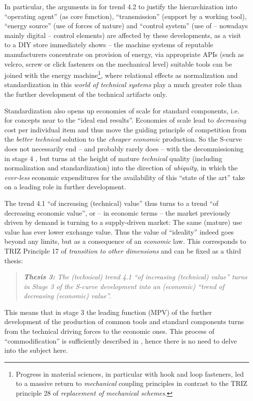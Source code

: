 \documentclass{llncs}
\begin{document}
In particular, the arguments in \cite{TESE2018} for trend 4.2 to justify the
hierarchization into ``operating agent'' (as core function), ``transmission''
(support by a working tool), ``energy source'' (use of forces of nature) and
``control system'' (use of -- nowadays mainly digital -- control elements) are
affected by these developments, as a visit to a DIY store immediately shows --
the machine systems of reputable manufacturers concentrate on provision of
energy, via appropriate APIs (such as velcro, screw or click fasteners on the
mechanical level) suitable tools can be joined with the energy
machine\footnote{Progress in material sciences, in particular with hook and
  loop fasteners, led to a massive return to \emph{mechanical} coupling
  principles in contrast to the TRIZ principle 28 of \emph{replacement of
    mechanical schemes}.}, where relational effects as normalization and
standardization in this \emph{world of technical systems} play a much greater
role than the further development of the technical artifacts only.

Standardization also opens up economies of scale for standard components,
i.e. for concepts near to the ``ideal end results''.  Economies of scale lead
to \emph{decreasing} cost per individual item and thus move the guiding
principle of competition from the \emph{better technical} solution to the
\emph{cheaper economic} production. So the S-curve does not necessarily end --
and probably rarely does -- with the decommissioning in stage 4
\cite[p. 38]{TESE2018}, but turns at the height of mature \emph{technical}
quality (including normalization and standardization) into the direction of
\emph{ubiquity}, in which the \emph{ever-less} economic expenditures for the
availability of this ``state of the art'' take on a leading role in further
development.

The trend 4.1 ``of increasing (technical) value'' thus turns to a trend ``of
decreasing economic value'', or -- in economic terms -- the market previously
driven by demand is turning to a supply-driven market: The same (mature) use
value has ever lower exchange value. Thus the value of ``ideality''
\cite[chapter 4.1.1]{KS2017} indeed goes beyond any limits, but as a
consequence of an \emph{economic} law. This corresponds to TRIZ Principle 17
of \emph{transition to other dimensions} and can be fixed as a third thesis:
\begin{quote}\it
 \textbf{Thesis 3:} The (technical) trend 4.1 ``of increasing (technical)
 value'' turns in Stage 3 of the S-curve development into an (economic)
 ``trend of decreasing (economic) value''.
\end{quote}
This means that in stage 3 the leading function (MPV) of the further
development of the production of common tools and standard components turns
from the technical driving forces to the economic ones. This process of
``commodification'' is sufficiently described in \cite{Naetar2005}, hence
there is no need to delve into the subject here. 
\end{document}
